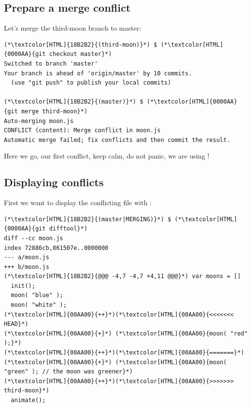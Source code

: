 \subsection{Prepare a merge conflict}
\begin{frame}[fragile]
  \subslidetitle

  Let's merge the third-moon branch to master:
  \begin{lstlisting}
(*\textcolor[HTML]{18B2B2}{(third-moon)}*) $ (*\textcolor[HTML]{0000AA}{git checkout master}*)
Switched to branch 'master'
Your branch is ahead of 'origin/master' by 10 commits.
  (use "git push" to publish your local commits)

(*\textcolor[HTML]{18B2B2}{(master)}*) $ (*\textcolor[HTML]{0000AA}{git merge third-moon}*)
Auto-merging moon.js
CONFLICT (content): Merge conflict in moon.js
Automatic merge failed; fix conflicts and then commit the result.
\end{lstlisting}
  \vspace{1em}
  Here we go, our first conflict, keep calm, do not panic, we are using !
\end{frame}

\subsection{Displaying conflicts}
\begin{frame}[fragile]
  \subslidetitle

  First we want to display the conflicting file with :
  \begin{lstlisting}
(*\textcolor[HTML]{18B2B2}{(master|MERGING)}*) $ (*\textcolor[HTML]{0000AA}{git difftool}*)
diff --cc moon.js
index 72886cb,861507e..0000000
--- a/moon.js
+++ b/moon.js
(*\textcolor[HTML]{18B2B2}{@@@ -4,7 -4,7 +4,11 @@@}*) var moons = []
  init();
  moon( "blue" );
  moon( "white" );
(*\textcolor[HTML]{00AA00}{++}*)(*\textcolor[HTML]{00AA00}{<<<<<<< HEAD}*)
(*\textcolor[HTML]{00AA00}{+}*) (*\textcolor[HTML]{00AA00}{moon( "red" );}*)
(*\textcolor[HTML]{00AA00}{++}*)(*\textcolor[HTML]{00AA00}{=======}*)
(*\textcolor[HTML]{00AA00}{+}*) (*\textcolor[HTML]{00AA00}{moon( "green" ); // the moon was greener}*)
(*\textcolor[HTML]{00AA00}{++}*)(*\textcolor[HTML]{00AA00}{>>>>>>> third-moon}*)
  animate();
\end{lstlisting}
\end{frame}

